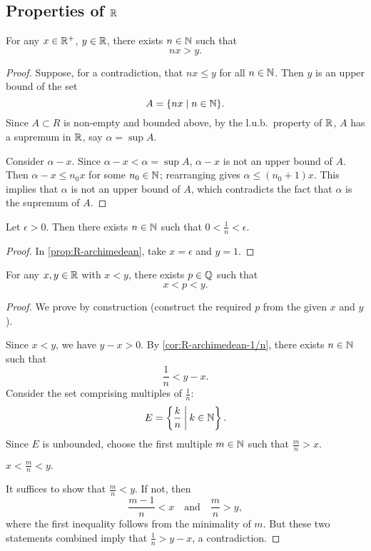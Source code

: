\subsection{Properties of $\RR$}
\begin{proposition}\label{prop:R-archimedean}
For any $x\in\mathbb R^+$, $y\in\mathbb R$, there exists $n\in\mathbb N$ such that
\[nx>y.\]
\end{proposition}

\begin{proof}
Suppose, for a contradiction, that $nx\le y$ for all $n\in\mathbb N$. Then $y$ is an upper bound of the set
\[A=\{nx\mid n\in\mathbb N\}.\]
Since $A\subset R$ is non-empty and bounded above, by the l.u.b.\ property of $\RR$, $A$ has a supremum in $\RR$, say $\alpha=\sup A$.

Consider $\alpha-x$. Since $\alpha-x<\alpha=\sup A$, $\alpha-x$ is not an upper bound of $A$. Then $\alpha-x\le n_0x$ for some $n_0\in\mathbb N$; rearranging gives $\alpha\le(n_0+1)x$. This implies that $\alpha$ is not an upper bound of $A$, which contradicts the fact that $\alpha$ is the supremum of $A$.
\end{proof}

\begin{corollary}\label{cor:R-archimedean-1/n}
Let $\epsilon>0$. Then there exists $n\in\mathbb N$ such that $0<\frac{1}{n}<\epsilon$.
\end{corollary}

\begin{proof}
In \ref{prop:R-archimedean}, take $x=\epsilon$ and $y=1$.
\end{proof}

\begin{proposition}[$\QQ$ is dense in $\RR$]
For any $x,y\in\mathbb R$ with $x<y$, there exists $p\in\mathbb Q$ such that 
\[x<p<y.\]
\end{proposition}

\begin{proof}
We prove by construction (construct the required $p$ from the given $x$ and $y$).

Since $x<y$, we have $y-x>0$. By \ref{cor:R-archimedean-1/n}, there exists $n\in\mathbb N$ such that
\[\frac{1}{n}<y-x.\]
Consider the set comprising multiples of $\frac{1}{n}$:
\[E=\left\{\frac{k}{n}\:\bigg|\:k\in\mathbb N\right\}.\]
Since $E$ is unbounded, choose the first multiple $m\in\mathbb N$ such that $\frac{m}{n}>x$.

\begin{claim}
$x<\frac{m}{n}<y.$
\end{claim}
It suffices to show that $\frac{m}{n}<y$. If not, then
\[\frac{m-1}{n}<x\quad\text{and}\quad\frac{m}{n}>y,\]
where the first inequality follows from the minimality of $m$. But these two statements combined imply that $\frac{1}{n}>y-x$, a contradiction.
\end{proof}

